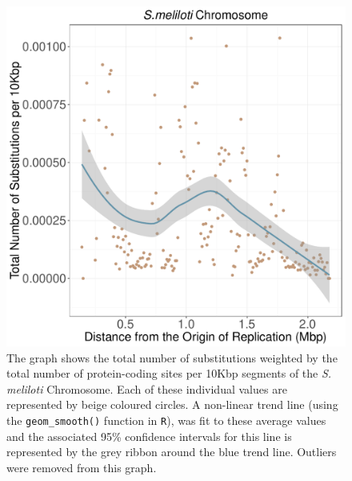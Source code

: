 \documentclass[11pt]{article}
\newcommand{\smel}{\textit{S.\,meliloti}\xspace}
\begin{document}
\begin{figure}[h]
	\begin{center}
		\includegraphics[width=\textwidth]{./figs/sinoC_10KB_weighted_subs_nonpar_22Sep20.pdf}
		\caption{\label{fig:sinoC_nonpar}The graph shows the total number of substitutions weighted by the total number of protein-coding sites per 10Kbp segments of the \smel Chromosome. Each of these individual values are represented by beige coloured circles. A non-linear trend line (using the \texttt{geom\_smooth()} function in \texttt{R}), was fit to these average values and the associated 95\% confidence intervals for this line is represented by the grey ribbon around the blue trend line. Outliers were removed from this graph.}
	\end{center}
\end{figure}
\end{document}
